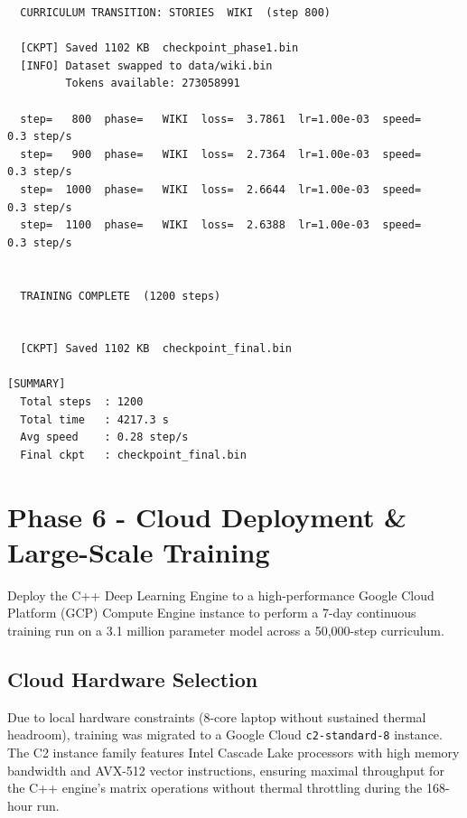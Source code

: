 \documentclass[12pt, a4paper]{article}
\begin{document}
\begin{verbatim}
  CURRICULUM TRANSITION: STORIES  WIKI  (step 800)

  [CKPT] Saved 1102 KB  checkpoint_phase1.bin
  [INFO] Dataset swapped to data/wiki.bin
         Tokens available: 273058991

  step=   800  phase=   WIKI  loss=  3.7861  lr=1.00e-03  speed=    0.3 step/s
  step=   900  phase=   WIKI  loss=  2.7364  lr=1.00e-03  speed=    0.3 step/s
  step=  1000  phase=   WIKI  loss=  2.6644  lr=1.00e-03  speed=    0.3 step/s
  step=  1100  phase=   WIKI  loss=  2.6388  lr=1.00e-03  speed=    0.3 step/s


  TRAINING COMPLETE  (1200 steps)


  [CKPT] Saved 1102 KB  checkpoint_final.bin

[SUMMARY]
  Total steps  : 1200
  Total time   : 4217.3 s
  Avg speed    : 0.28 step/s
  Final ckpt   : checkpoint_final.bin
\end{verbatim}

\section{Phase 6 - Cloud Deployment \& Large-Scale Training}

\begin{tcolorbox}[designbox, title={Phase 6 Goal}]
  Deploy the C++ Deep Learning Engine to a high-performance Google Cloud Platform (GCP) Compute Engine instance to perform a 7-day continuous training run on a 3.1 million parameter model across a 50,000-step curriculum.
\end{tcolorbox}

\subsection{Cloud Hardware Selection}
Due to local hardware constraints (8-core laptop without sustained thermal headroom), training was migrated to a Google Cloud \texttt{c2-standard-8} instance. The C2 instance family features Intel Cascade Lake processors with high memory bandwidth and AVX-512 vector instructions, ensuring maximal throughput for the C++ engine's matrix operations without thermal throttling during the 168-hour run.
\end{document}
